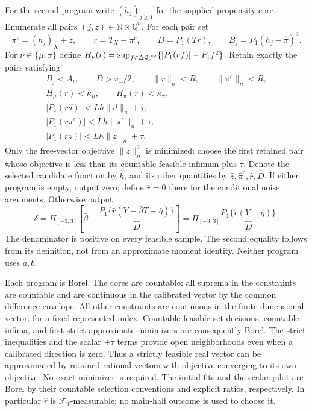 For the second program write $(h_j)_{j\ge1}$ for the supplied
propensity core. Enumerate all pairs $(j,z)\in\mathbb N\times\mathbb Q^n$.
For each pair set
\[
 \pi^c=(h_j)_X+z,\qquad r=T_X-\pi^c,
 \qquad D=P_1(Tr),\qquad B_j=P_1(h_j-\widehat\pi)^2.
\]
For $\nu\in\{\mu,\pi\}$ define
$H_\nu(r)=\sup_{f\in\Delta\mathcal G_\nu^{\rm rep}}
\{|P_1(rf)|-P_1f^2\}$. Retain exactly the pairs satisfying
\begin{equation}
 \begin{gathered}
 B_j<A_t,\qquad D>v_-/2,\qquad
 \|r\|_n<R,\qquad\|\pi^c\|_n<R,\\
 H_\mu(r)<\kappa_\mu,\qquad H_\pi(r)<\kappa_\pi,\\
 |P_1(rd)|<Lh\|d\|_n+\tau,\\
 |P_1(r\pi^c)|<Lh\|\pi^c\|_n+\tau,\\
 |P_1(rz)|<Lh\|z\|_n+\tau.
 \end{gathered}
 \label{eq:approximation-propensity-program}
\end{equation}
Only the free-vector objective $\|z\|_n^2$ is minimized: choose the
first retained pair whose objective is less than its countable feasible
infimum plus $\tau$. Denote the selected candidate function by
$\widehat h$, and its other quantities by
$\widehat z,\widehat\pi^c,\widehat r,\widehat D$.
If either program is empty, output zero; define $\widehat r=0$ there
for the conditional noise arguments. Otherwise output
\begin{equation}
 \delta=\Pi_{[-3,3]}\left[
 \bar\beta+
 \frac{P_1\{\widehat r(Y-\bar\beta T-\widehat\eta)\}}
      {\widehat D}\right]
 =\Pi_{[-3,3]}
 \frac{P_1\{\widehat r(Y-\widehat\eta)\}}{\widehat D}.
 \label{eq:approximation-rule}
\end{equation}
The denominator is positive on every feasible sample. The second
equality follows from its definition, not from an approximate moment
identity. Neither program uses $a,b$.

Each program is Borel. The cores are countable; all suprema in the
constraints are countable and are continuous in the calibrated vector
by the common difference envelope. All other constraints are continuous
in the finite-dimensional vector, for a fixed represented index.
Countable feasible-set decisions, countable infima, and first strict
approximate minimizers are consequently Borel. The strict inequalities
and the scalar $+\tau$ terms provide open neighborhoods even when a
calibrated direction is zero. Thus a strictly feasible real vector can
be approximated by retained rational vectors with objective converging
to its own objective. No exact minimizer is required. The initial fits
and the scalar pilot are Borel by their countable selection conventions
and explicit ratios, respectively. In particular $\widehat r$ is
$\mathcal F_T$-measurable: no main-half outcome is used to choose it.

